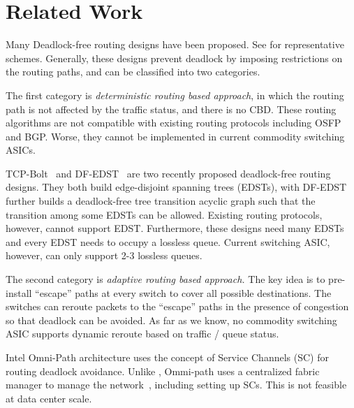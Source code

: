 \section{Related Work}\label{sec:related}

 Many Deadlock-free routing designs have been
proposed. See
\cite{dally,duato93,dally93,sancho2004,flich2012survey,lash,wu2003fault,glass,duato2001,domke2011,puente1999,dfedst16}
for representative schemes. Generally, these designs prevent deadlock by
imposing restrictions on the routing paths, and can be classified into two
categories.

The first category is {\em deterministic routing based approach}, in which the
routing path is not affected by the traffic status, and there is no CBD.  These
routing algorithms are not compatible with existing routing protocols including
OSFP and BGP. Worse, they cannot be implemented in current commodity switching
ASICs.

TCP-Bolt~\cite{tcpbolt} and DF-EDST~\cite{dfedst16} are two recently
proposed deadlock-free routing designs. They both build edge-disjoint
spanning trees (EDSTs), with DF-EDST~\cite{dfedst16} further builds a
deadlock-free tree transition acyclic graph such that the transition
among some EDSTs can be allowed. Existing routing protocols, however,
cannot support EDST. Furthermore, these designs need many EDSTs and
every EDST needs to occupy a lossless queue. Current switching ASIC,
however, can only support 2-3 lossless queues.

The second category is {\em adaptive routing based approach.} The key idea is to
pre-install  ``escape'' paths at every switch to cover all possible
destinations. The switches can reroute packets to the ``escape'' paths in the
presence of congestion so that deadlock can be avoided.  As far as we know, no
commodity switching ASIC supports dynamic reroute based on traffic / queue
status.

 Intel Omni-Path architecture \cite{omnipath} uses the
concept of Service Channels (SC) for routing deadlock avoidance.  Unlike
\sysname{}, Ommi-path uses a centralized fabric manager to manage the
network~\cite{omnipath}, including setting up SCs. This is not feasible at
data center scale.


